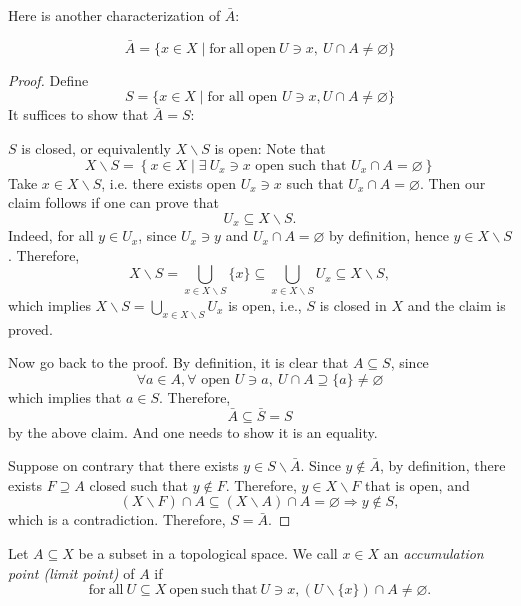 \begin{example}
Here is another characterization of \(\bar{A}\): 
\begin{proposition} \label{prop:closure_of_A}
\[
\bar{A} = \{ x \in  X \mid \mathrm{for\ all\ open\ }U \ni  x,\ U\cap A \neq  \varnothing \}
\]
\end{proposition}

\begin{proof} Define
\[
S = \{ x \in  X \mid  \text{for all open }U \ni  x,U \cap  A \neq  \varnothing \}
\]
It suffices to show that \(\bar{A} = S\): 

 \(S\) is closed, or equivalently $X \smallsetminus  S$ is open: Note that
\[
X \smallsetminus  S = \left\{  {x \in  X\mid \exists\ U_x \ni  x\text{ open such that }U_x \cap  A = \varnothing}\right\}
\]
Take \(x \in  X \smallsetminus  S\), i.e. there exists open \(U_x \ni  x\) such that \(U_x \cap  A = \varnothing\). Then our claim follows if one can prove that
\[U_x \subseteq  X \smallsetminus  S.\]
Indeed, for all \(y \in  U_x\), since \(U_x \ni  y\) and \(U_x \cap  A = \varnothing\) by definition, hence 
\(y \in  X \smallsetminus  S\).
Therefore, 
\[
X \smallsetminus  S = \mathop{\bigcup}\limits_{{x \in  X \smallsetminus  S}}\{ x\}  \subseteq  \mathop{\bigcup}\limits_{{x \in  X \smallsetminus  S}}U_x \subseteq  X \smallsetminus  S,
\]
which implies \(X \smallsetminus  S = \mathop{\bigcup}\limits_{{x \in  X \smallsetminus  S}}U_x\) is open, i.e., \(S\) is closed in \(X\) and the claim is proved.

Now go back to the proof. By definition, it is clear that \(A \subseteq  S\), since
\[
\forall a \in  A,\forall \text{ open }U \ni  a,\ U\cap A \supseteq  \{ a\}  \neq  \varnothing
\]
which implies that $a \in  S$. Therefore, 
\[\bar{A} \subseteq  \bar{S} = S\]
by the above claim. And one needs to show it is an equality.

Suppose on contrary that there exists \(y \in  S \smallsetminus  \bar{A}\). Since \(y \notin  \bar{A}\), by definition, there exists \(F \supseteq  A\) closed such that \(y \notin  F\).
Therefore, \(y \in  X \smallsetminus  F\) that is open, and
\[
\left({X \smallsetminus  F}\right) \cap A \subseteq  \left({X \smallsetminus  A}\right) \cap A = \varnothing  \Rightarrow  y \notin  S,
\]
which is a contradiction. Therefore, \(S = \bar{A}\).
\end{proof}

\begin{definition} Let \(A \subseteq  X\) be a subset in a topological space. We call \(x \in  X\) an \emph{accumulation point (limit point)} of \(A\) if
\[
\mathrm{for\ all\ } U \subseteq  X \mathrm{\ open\ such\ that\ }U \ni  x,\left({U\smallsetminus \{ x\}}\right) \cap A \neq  \varnothing.
\]
\end{definition}


\end{example}

